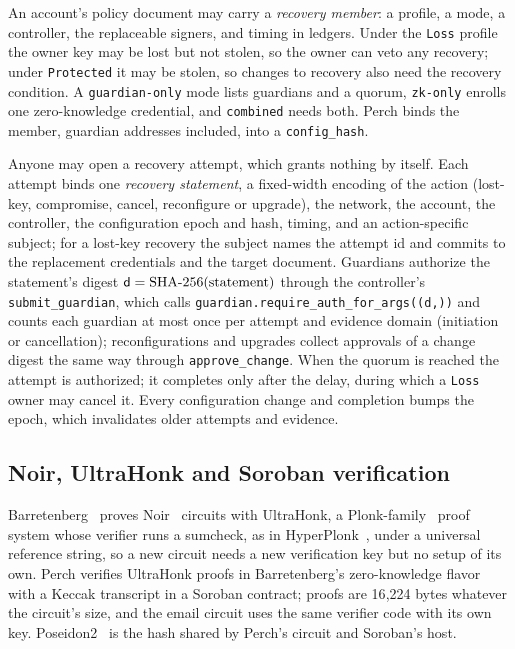An account's policy document may carry a \emph{recovery member}: a profile,
a mode, a controller, the replaceable signers, and timing in ledgers. Under
the \texttt{Loss} profile the owner key may be lost but not stolen, so the
owner can veto any recovery; under \texttt{Protected} it may be stolen, so
changes to recovery also need the recovery condition. A
\texttt{guardian-only} mode lists guardians and a quorum, \texttt{zk-only}
enrolls one zero-knowledge credential, and \texttt{combined} needs both.
Perch binds the member, guardian addresses included, into a
\texttt{config\_hash}.

Anyone may open a recovery attempt, which grants nothing by itself. Each
attempt binds one \emph{recovery statement}, a fixed-width encoding of the
action (lost-key, compromise, cancel, reconfigure or upgrade), the network,
the account, the controller, the configuration epoch and hash, timing, and
an action-specific subject; for a lost-key recovery the subject names the
attempt id and commits to the replacement credentials and the target
document. Guardians authorize the statement's digest
$\mathsf{d} = \mathrm{SHA\text{-}256}(\text{statement})$ through the controller's
\texttt{submit\_guardian}, which calls
\texttt{guardian.require\_auth\_for\_args((d,))} and counts each guardian at
most once per attempt and evidence domain (initiation or cancellation);
reconfigurations and upgrades collect approvals of a change digest the same
way through \texttt{approve\_change}. When the quorum is reached the attempt is authorized;
it completes only after the delay, during which a \texttt{Loss} owner may
cancel it. Every configuration change and completion bumps the epoch, which
invalidates older attempts and evidence.

\subsection{Noir, UltraHonk and Soroban verification}
Barretenberg~\cite{barretenberg-docs} proves Noir~\cite{noir-docs} circuits
with UltraHonk, a Plonk-family~\cite{plonk} proof system whose verifier runs
a sumcheck, as in HyperPlonk~\cite{hyperplonk}, under a universal reference
string, so a new circuit needs a new verification key but no setup of its
own. Perch verifies UltraHonk proofs in Barretenberg's zero-knowledge flavor
with a Keccak transcript in a Soroban contract; proofs are 16{,}224 bytes
whatever the circuit's size, and the email circuit uses
the same verifier code with its own key. Poseidon2~\cite{poseidon2} is the
hash shared by Perch's circuit and Soroban's host.
